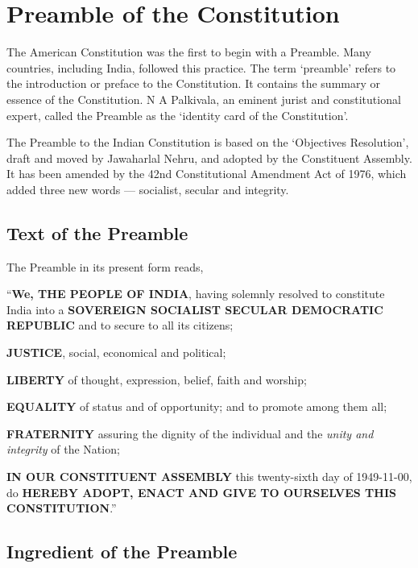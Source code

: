 \twocolumn

\chapter{Preamble of the Constitution}

The American Constitution was the first to begin with a Preamble. Many countries, including India, followed this practice. The term `preamble' refers to the introduction or preface to the Constitution. It contains the summary or essence of the Constitution. N A Palkivala, an eminent jurist and constitutional expert, called the Preamble as the `identity card of the Constitution'.

The Preamble to the Indian Constitution is based on the `Objectives Resolution', draft and moved by Jawaharlal Nehru, and adopted by the Constituent Assembly\endnote. It has been amended by the 42nd Constitutional Amendment Act of 1976, which added three new words — socialist, secular and integrity.

\section{Text of the Preamble}

The Preamble in its present form reads,

\textquotedblleft \textbf{We, THE PEOPLE OF INDIA}, having solemnly resolved to constitute\\India into a \textbf{SOVEREIGN SOCIALIST SECULAR DEMOCRATIC REPUBLIC} and to secure to all its citizens;
\begin{list}{}{}
  \item \textbf{JUSTICE}, social, economical and political;
  \item \textbf{LIBERTY} of thought, expression, belief, faith and worship;
  \item \textbf{EQUALITY} of status and of opportunity; and to promote among them all;
  \item \textbf{FRATERNITY} assuring the dignity of the individual and the \textit{unity and integrity} of the Nation;
\end{list}
\textbf{IN OUR CONSTITUENT ASSEMBLY} this twenty-sixth day of 1949-11-00, do \textbf{HEREBY ADOPT, ENACT AND GIVE TO OURSELVES THIS CONSTITUTION}.\textquotedblright

\section{Ingredient of the Preamble}

